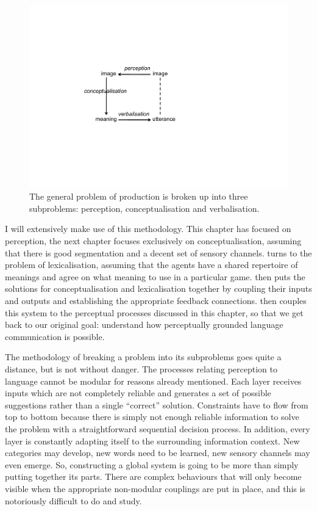 \begin{figure}[htbp]
  \centerline{\includegraphics[width=.50\textwidth]{chap3/figs/square.pdf}}
\caption{\label{square}The general problem of 
production is broken up into three subproblems: perception, 
conceptualisation and verbalisation.}
\end{figure}

I will extensively make use of this methodology. 
This chapter has focused on perception, the next chapter focuses
exclusively on
conceptualisation, assuming that there is good segmentation and a 
decent set of sensory channels.  turns to the 
problem of lexicalisation, assuming that 
the agents have a shared repertoire of meanings and agree on 
what meaning to use in a particular game.  then puts the solutions 
for conceptualisation and lexicalisation together by coupling their
inputs and outputs and establishing the appropriate feedback connections. 
 then couples this system to the perceptual processes discussed
in this chapter, so that we get back to our 
original goal: understand how perceptually grounded language communication 
is possible. 

The methodology of breaking a problem into its subproblems goes quite 
a distance, but is not without danger. The processes relating
perception to language cannot be modular for reasons already mentioned. 
Each layer receives inputs which are not completely reliable and 
generates a set of possible suggestions rather than a single
``correct'' solution. Constraints have to flow
from top to bottom because there is simply not enough reliable 
information to solve the problem with a straightforward sequential 
decision process. In addition, every layer is constantly adapting 
itself to the surrounding information context. New categories 
may develop, new words need to be learned, new sensory 
channels may even emerge. So, constructing a global system is going 
to be more than simply putting together its parts. There are complex
behaviours that will only become visible when the appropriate non-modular
couplings are put in place, and this is notoriously difficult to 
do and study. 

